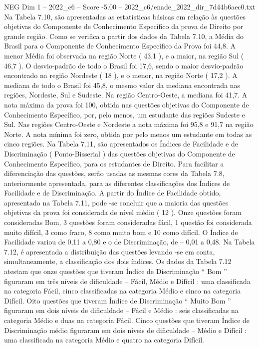\begin{textsample}{NEG Dim 1 – 2022\_c6 – Score -5.00 – 2022\_c6/enade\_2022\_dir\_7d44b6aec0.txt}
Na Tabela 7.10, são apresentadas as estatísticas básicas em relação às questões objetivas do Componente de Conhecimento Específico da prova de Direito por grande região.
Como se verifica a partir dos dados da Tabela 7.10, a Média do Brasil para o Componente de Conhecimento Específico da Prova foi 44,8.
A menor Média foi observada na região Norte ( 43,1 ), e a maior, na região Sul ( 46,7 ).
O desvio-padrão de todo o Brasil foi 17,6, sendo o maior desvio-padrão encontrado na região Nordeste ( 18 ), e o menor, na região Norte ( 17,2 ).
A mediana de todo o Brasil foi 45,8, o mesmo valor da mediana encontrada nas regiões, Nordeste, Sul e Sudeste.
Na região Centro-Oeste, a mediana foi 41,7.
A nota máxima da prova foi 100, obtida nas questões objetivas do Componente de Conhecimento Específico, por, pelo menos, um estudante das regiões Sudeste e Sul.
Nas regiões Centro-Oeste e Nordeste a nota máxima foi 95,8 e 91,7 na região Norte.
A nota mínima foi zero, obtida por pelo menos um estudante em todas as cinco regiões.
Na Tabela 7.11, são apresentados os Índices de Facilidade e de Discriminação ( Ponto-Bisserial ) das questões objetivas do Componente de Conhecimento Específico, para os estudantes de Direito.
Para facilitar a diferenciação das questões, serão usadas as mesmas cores da Tabela 7.8, anteriormente apresentada, para as diferentes classificações dos Índices de Facilidade e de Discriminação.
A partir do Índice de Facilidade obtido, apresentado na Tabela 7.11, pode -se concluir que a maioria das questões objetivas da prova foi considerada de nível médio ( 12 ).
Onze questões foram consideradas Bom, 3 questões foram consideradas fácil, 1 questão foi considerada muito difícil, 3 como fraco, 8 como muito bom e 10 como difícil.
O Índice de Facilidade variou de 0,11 a 0,80 e o de Discriminação, de – 0,01 a 0,48.
Na Tabela 7.12, é apresentada a distribuição das questões levando -se em conta, simultaneamente, a classificação dos dois índices.
Os dados da Tabela 7.12 atestam que onze questões que tiveram Índice de Discriminação “ Bom ” figuraram em três níveis de dificuldade – Fácil, Médio e Difícil : uma classificada na categoria Fácil, cinco classificadas na categoria Médio e cinco na categoria Difícil.
Oito questões que tiveram Índice de Discriminação “ Muito Bom ” figuraram em dois níveis de dificuldade – Fácil e Médio : seis classificadas na categoria Médio e duas na categoria Fácil.
Cinco questões que tiveram Índice de Discriminação médio figuraram em dois níveis de dificuldade – Médio e Difícil : uma classificada na categoria Médio e quatro na categoria Difícil.

\end{textsample}
